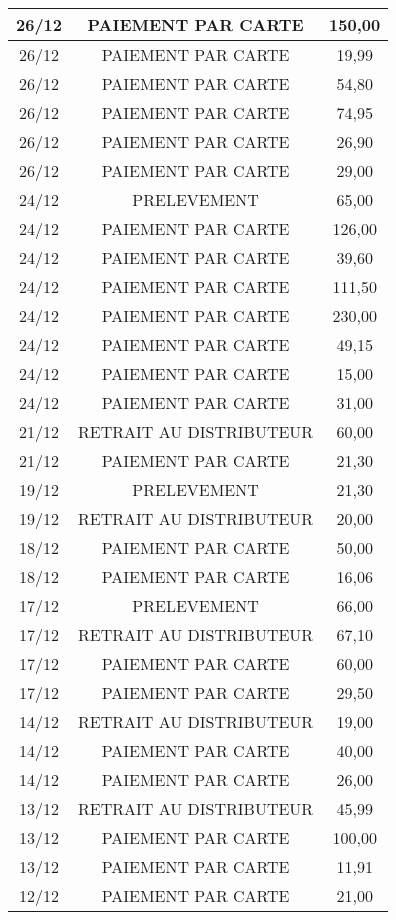 \begin{longtable}{|c|c|c|}
\hline
26/12 & PAIEMENT PAR CARTE & 150,00 \\
\hline
26/12 & PAIEMENT PAR CARTE & 19,99 \\
\hline
26/12 & PAIEMENT PAR CARTE & 54,80 \\
\hline
26/12 & PAIEMENT PAR CARTE & 74,95 \\
\hline
26/12 & PAIEMENT PAR CARTE & 26,90 \\
\hline
26/12 & PAIEMENT PAR CARTE & 29,00 \\
\hline
24/12 & PRELEVEMENT & 65,00 \\
\hline
24/12 & PAIEMENT PAR CARTE & 126,00 \\
\hline
24/12 & PAIEMENT PAR CARTE & 39,60 \\
\hline
24/12 & PAIEMENT PAR CARTE & 111,50 \\
\hline
24/12 & PAIEMENT PAR CARTE & 230,00 \\
\hline
24/12 & PAIEMENT PAR CARTE & 49,15 \\
\hline
24/12 & PAIEMENT PAR CARTE & 15,00 \\
\hline
24/12 & PAIEMENT PAR CARTE & 31,00 \\
\hline
21/12 & RETRAIT AU DISTRIBUTEUR & 60,00 \\
\hline
21/12 & PAIEMENT PAR CARTE & 21,30 \\
\hline
19/12 & PRELEVEMENT & 21,30 \\
\hline
19/12 & RETRAIT AU DISTRIBUTEUR & 20,00 \\
\hline
18/12 & PAIEMENT PAR CARTE & 50,00 \\
\hline
18/12 & PAIEMENT PAR CARTE & 16,06 \\
\hline
17/12 & PRELEVEMENT & 66,00 \\
\hline
17/12 & RETRAIT AU DISTRIBUTEUR & 67,10 \\
\hline
17/12 & PAIEMENT PAR CARTE & 60,00 \\
\hline
17/12 & PAIEMENT PAR CARTE & 29,50 \\
\hline
14/12 & RETRAIT AU DISTRIBUTEUR & 19,00 \\
\hline
14/12 & PAIEMENT PAR CARTE & 40,00 \\
\hline
14/12 & PAIEMENT PAR CARTE & 26,00 \\
\hline
13/12 & RETRAIT AU DISTRIBUTEUR & 45,99 \\
\hline
13/12 & PAIEMENT PAR CARTE & 100,00 \\
\hline
13/12 & PAIEMENT PAR CARTE & 11,91 \\
\hline
12/12 & PAIEMENT PAR CARTE & 21,00 \\

\end{longtable}

